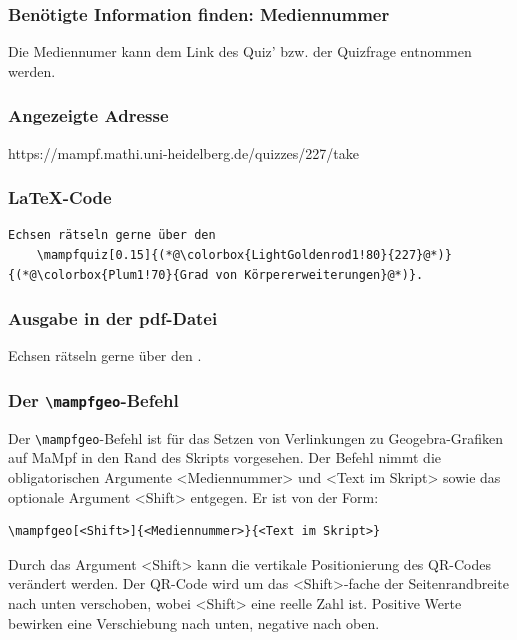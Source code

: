 \documentclass[parskip=off,index=totocnumbered]{scrartcl}
\begin{document}
\subsubsection*{Benötigte Information finden: Mediennummer}
Die Mediennumer kann dem Link des Quiz' bzw. der Quizfrage entnommen werden.

\subsubsection*{Angezeigte Adresse}
https://mampf.mathi.uni-heidelberg.de/quizzes/\colorbox{LightGoldenrod1!80}{227}/take

\subsubsection*{\LaTeX-Code}
\vspace{-0.2cm}
   \begin{lstlisting}   
Echsen rätseln gerne über den
    \mampfquiz[0.15]{(*@\colorbox{LightGoldenrod1!80}{227}@*)}{(*@\colorbox{Plum1!70}{Grad von Körpererweiterungen}@*)}. 
   \end{lstlisting}
\vspace{0.2cm}

\subsubsection*{Ausgabe in der pdf-Datei}
Echsen rätseln gerne über den .
\vspace{0.4cm}


\subsubsection{Der \texttt{\textbackslash mampfgeo}-Befehl} \label{subsubsec:geo}
Der \verb|\mampfgeo|-Befehl ist für das Setzen von Verlinkungen zu Geogebra-Grafiken auf MaMpf in den Rand des Skripts vorgesehen. Der Befehl nimmt die obligatorischen Argumente <Mediennummer> und <Text im Skript> sowie das optionale Argument <Shift> entgegen. Er ist von der Form:

   \begin{verbatim}
\mampfgeo[<Shift>]{<Mediennummer>}{<Text im Skript>}
   \end{verbatim}
\vspace{-0.5cm}
Durch das Argument <Shift> kann die vertikale Positionierung des QR-Codes verändert werden. Der QR-Code wird um das <Shift>-fache der Seitenrandbreite nach unten verschoben, wobei <Shift> eine reelle Zahl ist. Positive Werte bewirken eine Verschiebung nach unten, negative nach oben.  
\end{document}
